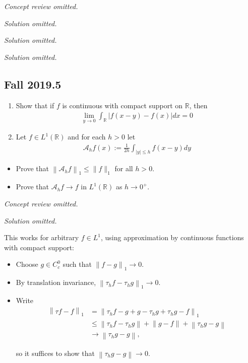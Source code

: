 \emph{Concept review omitted.}

\emph{Solution omitted.}

\emph{Solution omitted.}

\emph{Solution omitted.}

\hypertarget{fall-2019.5}{%
\subsection{Fall 2019.5}\label{fall-2019.5}}

\begin{enumerate}
\def\labelenumi{\alph{enumi}.}
\item
  Show that if \(f\) is continuous with compact support on
  \({\mathbb{R}}\), then
  \begin{align*}
  \lim _{y \rightarrow 0} \int_{\mathbb{R}}|f(x-y)-f(x)| d x=0
  \end{align*}
\item
  Let \(f\in L^1({\mathbb{R}})\) and for each \(h > 0\) let
  \begin{align*}
  \mathcal{A}_{h} f(x):=\frac{1}{2 h} \int_{|y| \leq h} f(x-y) d y
  \end{align*}
\end{enumerate}

\begin{itemize}
\item
  Prove that \(\left\|\mathcal{A}_{h} f\right\|_{1} \leq\|f\|_{1}\) for
  all \(h > 0\).
\item
  Prove that \(\mathcal{A}_h f \to f\) in \(L^1({\mathbb{R}})\) as
  \(h \to 0^+\).
\end{itemize}


\emph{Concept review omitted.}

\emph{Solution omitted.}

\begin{remark}

This works for arbitrary \(f\in L^1\), using approximation by continuous
functions with compact support:

\begin{itemize}
\item
  Choose \(g\in C_c^0\) such that
  \({\left\lVert {f- g} \right\rVert}_1 \to 0\).
\item
  By translation invariance,
  \({\left\lVert {\tau_h f - \tau_h g} \right\rVert}_1 \to 0\).
\item
  Write
  \begin{align*}
  {\left\lVert {\tau f - f} \right\rVert}_1 
  &= {\left\lVert {\tau_h f - g + g - \tau_h g + \tau_h g - f} \right\rVert}_1 \\
  &\leq {\left\lVert {\tau_h f - \tau_h g} \right\rVert} + {\left\lVert {g - f} \right\rVert} + {\left\lVert {\tau_h g - g} \right\rVert} \\
  &\to {\left\lVert {\tau_h g - g} \right\rVert}
  ,\end{align*}

  so it suffices to show that
  \({\left\lVert {\tau_h g - g} \right\rVert} \to 0\).
\end{itemize}

\end{remark}

